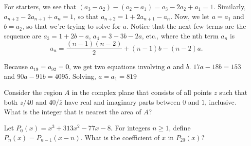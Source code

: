 \documentclass[11pt]{article}
\theoremstyle{definition}
\begin{document}
\begin{solution}[name={Solution by 4everwise}]
	For starters, we see that $(a_3-a_2)-(a_2-a_1)=a_3-2a_2+a_1=1$. Similarly, $a_{n+2}-2a_{n+1}+a_n=1$, so that $a_{n+2}=1+2a_{n+1}-a_n$. Now, we let $a=a_1$ and $b=a_2$, so that we're trying to solve for $a$. Notice that the next few terms are the sequence are $a_3=1+2b-a$, $a_4=3+3b-2a$, etc., where the nth term $a_n$ is $$a_n=\frac{(n-1)(n-2)}{2}+(n-1)b-(n-2)a.$$
	
	Because $a_{19}=a_{92}=0$, we get two equations involving $a$ and $b$. $17a-18b=153$ and $90a-91b=4095$. Solving, $a=a_1=\boxed{819}$
\end{solution}













\begin{question}[name={1992 AIME, \href{https://artofproblemsolving.com/community/c4p430620}{Problem 10}}]
	Consider the region $A$ in the complex plane that consists of all points $z$ such that both ${z}/{40}$ and ${40}/{\overline{z}}$ have real and imaginary parts between $0$ and $1$, inclusive. What is the integer that is nearest the area of $A$?	
\end{question}
%
%
%	
%	
%
%
%









\begin{question}[name={1993 AIME, \href{https://artofproblemsolving.com/community/c4p461986}{Problem 5}}]
	Let $P_0(x) = x^3 + 313x^2 - 77x - 8$. For integers $n \ge 1$, define $P_n(x) = P_{n - 1}(x - n)$. What is the coefficient of $x$ in $P_{20}(x)$?
\end{question}
\end{document}
